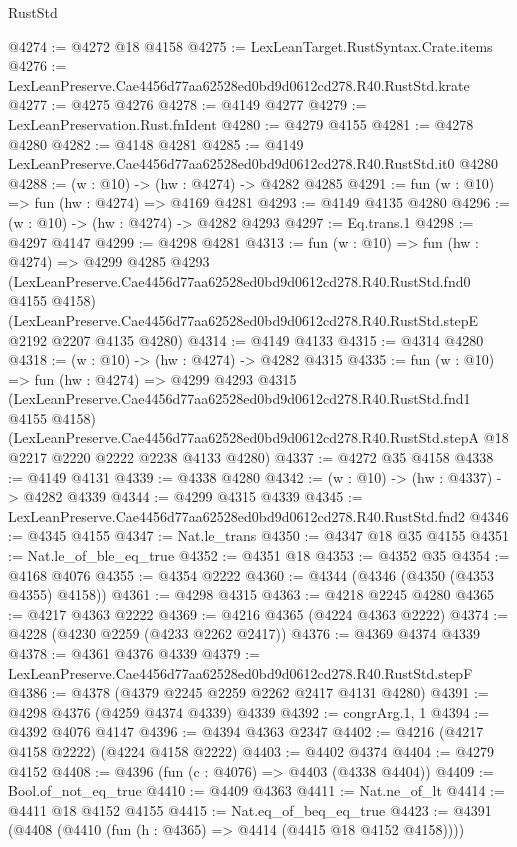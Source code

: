 \begin{lexlean}{RustStd}
\begin{coremodule}
@4274 := @4272 @18 @4158
@4275 := LexLeanTarget.RustSyntax.Crate.items
@4276 := LexLeanPreserve.Cae4456d77aa62528ed0bd9d0612cd278.R40.RustStd.krate
@4277 := @4275 @4276
@4278 := @4149 @4277
@4279 := LexLeanPreservation.Rust.fnIdent
@4280 := @4279 @4155
@4281 := @4278 @4280
@4282 := @4148 @4281
@4285 := @4149 LexLeanPreserve.Cae4456d77aa62528ed0bd9d0612cd278.R40.RustStd.it0 @4280
@4288 := (w : @10) -> (hw : @4274) -> @4282 @4285
@4291 := fun (w : @10) => fun (hw : @4274) => @4169 @4281
@4293 := @4149 @4135 @4280
@4296 := (w : @10) -> (hw : @4274) -> @4282 @4293
@4297 := Eq.trans.{1}
@4298 := @4297 @4147
@4299 := @4298 @4281
@4313 := fun (w : @10) =>
  fun (hw : @4274) =>
  @4299
    @4285
    @4293
    (LexLeanPreserve.Cae4456d77aa62528ed0bd9d0612cd278.R40.RustStd.fnd0 @4155 @4158)
    (LexLeanPreserve.Cae4456d77aa62528ed0bd9d0612cd278.R40.RustStd.stepE @2192 @2207 @4135 @4280)
@4314 := @4149 @4133
@4315 := @4314 @4280
@4318 := (w : @10) -> (hw : @4274) -> @4282 @4315
@4335 := fun (w : @10) =>
  fun (hw : @4274) =>
  @4299
    @4293
    @4315
    (LexLeanPreserve.Cae4456d77aa62528ed0bd9d0612cd278.R40.RustStd.fnd1 @4155 @4158)
    (LexLeanPreserve.Cae4456d77aa62528ed0bd9d0612cd278.R40.RustStd.stepA
      @18
      @2217
      @2220
      @2222
      @2238
      @4133
      @4280)
@4337 := @4272 @35 @4158
@4338 := @4149 @4131
@4339 := @4338 @4280
@4342 := (w : @10) -> (hw : @4337) -> @4282 @4339
@4344 := @4299 @4315 @4339
@4345 := LexLeanPreserve.Cae4456d77aa62528ed0bd9d0612cd278.R40.RustStd.fnd2
@4346 := @4345 @4155
@4347 := Nat.le_trans
@4350 := @4347 @18 @35 @4155
@4351 := Nat.le_of_ble_eq_true
@4352 := @4351 @18
@4353 := @4352 @35
@4354 := @4168 @4076
@4355 := @4354 @2222
@4360 := @4344 (@4346 (@4350 (@4353 @4355) @4158))
@4361 := @4298 @4315
@4363 := @4218 @2245 @4280
@4365 := @4217 @4363 @2222
@4369 := @4216 @4365 (@4224 @4363 @2222)
@4374 := @4228 (@4230 @2259 (@4233 @2262 @2417))
@4376 := @4369 @4374 @4339
@4378 := @4361 @4376 @4339
@4379 := LexLeanPreserve.Cae4456d77aa62528ed0bd9d0612cd278.R40.RustStd.stepF
@4386 := @4378 (@4379 @2245 @2259 @2262 @2417 @4131 @4280)
@4391 := @4298 @4376 (@4259 @4374 @4339) @4339
@4392 := congrArg.{1, 1}
@4394 := @4392 @4076 @4147
@4396 := @4394 @4363 @2347
@4402 := @4216 (@4217 @4158 @2222) (@4224 @4158 @2222)
@4403 := @4402 @4374
@4404 := @4279 @4152
@4408 := @4396 (fun (c : @4076) => @4403 (@4338 @4404))
@4409 := Bool.of_not_eq_true
@4410 := @4409 @4363
@4411 := Nat.ne_of_lt
@4414 := @4411 @18 @4152 @4155
@4415 := Nat.eq_of_beq_eq_true
@4423 := @4391 (@4408 (@4410 (fun (h : @4365) => @4414 (@4415 @18 @4152 @4158))))

\end{coremodule}
\end{lexlean}
